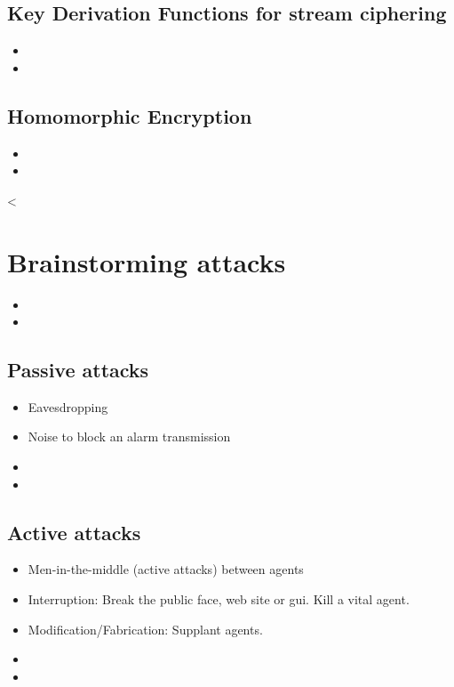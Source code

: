 \documentclass[10pt,a4paper,twoside]{llncs}
\begin{document}
%
\subsection{Key Derivation Functions for stream ciphering \label{sec:kdfStreaming}}

\begin{itemize}
 \item 
 \item 
\end{itemize}

%
\subsection{Homomorphic Encryption \label{sec:Homorph}}
\begin{itemize}
 \item 
 \item 
\end{itemize}
<
%
\section{Brainstorming attacks \label{sec:attacks}}

\begin{itemize}
 \item
 \item 
\end{itemize}

%
\subsection{Passive attacks \label{sec:passiveAttacks}}

\begin{itemize}
 \item Eavesdropping
 \item Noise to block an alarm transmission
 \item 
 \item 
\end{itemize}

%
\subsection{Active attacks \label{sec:activeAttacks}}

\begin{itemize}
 \item Men-in-the-middle (active attacks) between agents
 \item Interruption: Break the public face, web site or gui. Kill a vital agent.
 \item Modification/Fabrication: Supplant agents.
 \item 
 \item 
\end{itemize}
\end{document}
